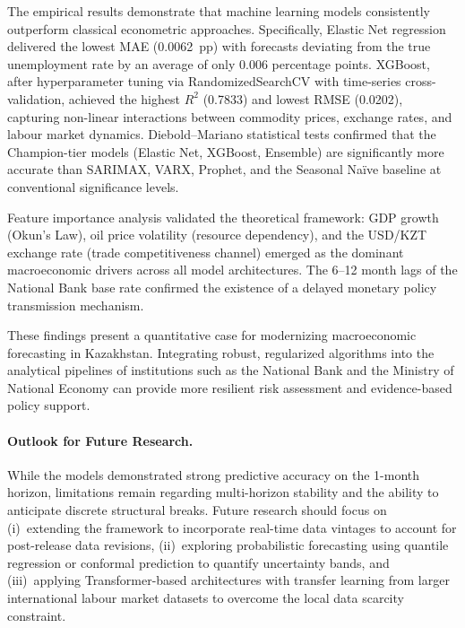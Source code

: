 \documentclass[14pt, a4paper]{extarticle}
\begin{document}
The empirical results demonstrate that machine learning models consistently outperform classical econometric approaches. Specifically, Elastic Net regression delivered the lowest MAE (0.0062~pp) with forecasts deviating from the true unemployment rate by an average of only 0.006 percentage points. XGBoost, after hyperparameter tuning via RandomizedSearchCV with time-series cross-validation, achieved the highest $R^2$ (0.7833) and lowest RMSE (0.0202), capturing non-linear interactions between commodity prices, exchange rates, and labour market dynamics. Diebold--Mariano statistical tests confirmed that the Champion-tier models (Elastic Net, XGBoost, Ensemble) are significantly more accurate than SARIMAX, VARX, Prophet, and the Seasonal Na\"ive baseline at conventional significance levels.

Feature importance analysis validated the theoretical framework: GDP growth (Okun's Law), oil price volatility (resource dependency), and the USD/KZT exchange rate (trade competitiveness channel) emerged as the dominant macroeconomic drivers across all model architectures. The 6--12 month lags of the National Bank base rate confirmed the existence of a delayed monetary policy transmission mechanism.

These findings present a quantitative case for modernizing macroeconomic forecasting in Kazakhstan. Integrating robust, regularized algorithms into the analytical pipelines of institutions such as the National Bank and the Ministry of National Economy can provide more resilient risk assessment and evidence-based policy support.

\paragraph{Outlook for Future Research.}
While the models demonstrated strong predictive accuracy on the 1-month horizon, limitations remain regarding multi-horizon stability and the ability to anticipate discrete structural breaks. Future research should focus on (i)~extending the framework to incorporate real-time data vintages to account for post-release data revisions, (ii)~exploring probabilistic forecasting using quantile regression or conformal prediction to quantify uncertainty bands, and (iii)~applying Transformer-based architectures with transfer learning from larger international labour market datasets to overcome the local data scarcity constraint.
\end{document}
